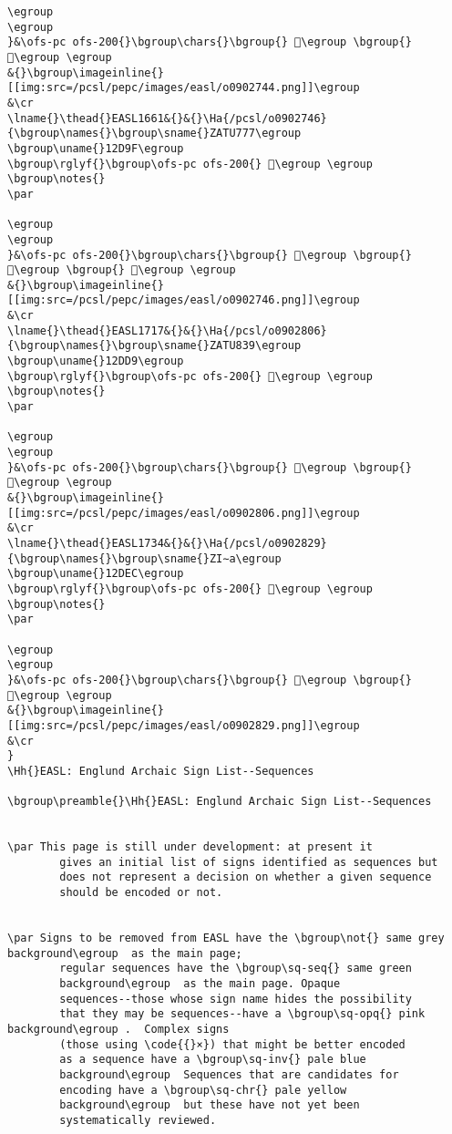 \begin{verbatim}
\egroup
\egroup
}&\ofs-pc ofs-200{}\bgroup\chars{}\bgroup{} 𒶞\egroup \bgroup{} 𒶝\egroup \egroup
&{}\bgroup\imageinline{}[[img:src=/pcsl/pepc/images/easl/o0902744.png]]\egroup
&\cr
\lname{}\thead{}EASL1661&{}&{}\Ha{/pcsl/o0902746}{\bgroup\names{}\bgroup\sname{}ZATU777\egroup
\bgroup\uname{}12D9F\egroup
\bgroup\rglyf{}\bgroup\ofs-pc ofs-200{} 𒶟\egroup \egroup
\bgroup\notes{}
\par 

\egroup
\egroup
}&\ofs-pc ofs-200{}\bgroup\chars{}\bgroup{} 𒶟\egroup \bgroup{} 𒶠\egroup \bgroup{} 𒶡\egroup \egroup
&{}\bgroup\imageinline{}[[img:src=/pcsl/pepc/images/easl/o0902746.png]]\egroup
&\cr
\lname{}\thead{}EASL1717&{}&{}\Ha{/pcsl/o0902806}{\bgroup\names{}\bgroup\sname{}ZATU839\egroup
\bgroup\uname{}12DD9\egroup
\bgroup\rglyf{}\bgroup\ofs-pc ofs-200{} 𒷙\egroup \egroup
\bgroup\notes{}
\par 

\egroup
\egroup
}&\ofs-pc ofs-200{}\bgroup\chars{}\bgroup{} 𒷙\egroup \bgroup{} 𒷚\egroup \egroup
&{}\bgroup\imageinline{}[[img:src=/pcsl/pepc/images/easl/o0902806.png]]\egroup
&\cr
\lname{}\thead{}EASL1734&{}&{}\Ha{/pcsl/o0902829}{\bgroup\names{}\bgroup\sname{}ZI∼a\egroup
\bgroup\uname{}12DEC\egroup
\bgroup\rglyf{}\bgroup\ofs-pc ofs-200{} 𒷬\egroup \egroup
\bgroup\notes{}
\par 

\egroup
\egroup
}&\ofs-pc ofs-200{}\bgroup\chars{}\bgroup{} 𒷫\egroup \bgroup{} 𒷬\egroup \egroup
&{}\bgroup\imageinline{}[[img:src=/pcsl/pepc/images/easl/o0902829.png]]\egroup
&\cr
}
\Hh{}EASL: Englund Archaic Sign List--Sequences

\bgroup\preamble{}\Hh{}EASL: Englund Archaic Sign List--Sequences


\par This page is still under development: at present it
	    gives an initial list of signs identified as sequences but
	    does not represent a decision on whether a given sequence
	    should be encoded or not.


\par Signs to be removed from EASL have the \bgroup\not{} same grey background\egroup  as the main page;
	    regular sequences have the \bgroup\sq-seq{} same green
	    background\egroup  as the main page. Opaque
	    sequences--those whose sign name hides the possibility
	    that they may be sequences--have a \bgroup\sq-opq{} pink background\egroup .  Complex signs
	    (those using \code{{}×}) that might be better encoded
	    as a sequence have a \bgroup\sq-inv{} pale blue
	    background\egroup  Sequences that are candidates for
	    encoding have a \bgroup\sq-chr{} pale yellow
	    background\egroup  but these have not yet been
	    systematically reviewed.


\end{verbatim}
